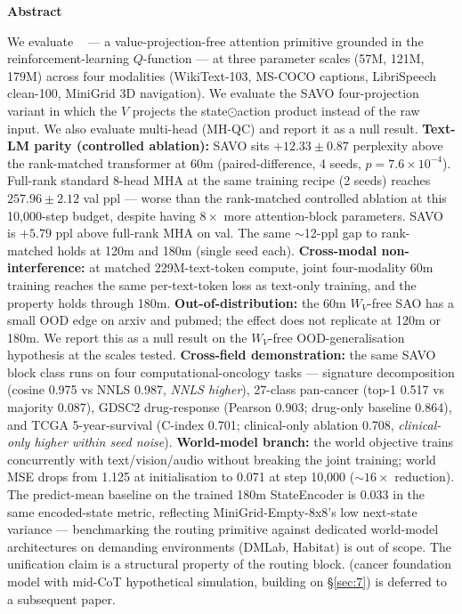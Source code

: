 \begin{center}
\textbf{Abstract}
\end{center}

{\small\noindent{}
We evaluate \QC{}~\cite{ref1} --- a value-projection-free attention primitive grounded in the reinforcement-learning $Q$-function --- at three parameter scales (57M, 121M, 179M) across four modalities (WikiText-103, MS-COCO captions, LibriSpeech clean-100, MiniGrid 3D navigation). We evaluate the SAVO four-projection variant in which the $V$ projects the state$\odot$action product instead of the raw input. We also evaluate multi-head \QC{} (MH-QC) and report it as a null result. \textbf{Text-LM parity (controlled ablation):} SAVO sits $+12.33 \pm 0.87$ perplexity above the rank-matched transformer at 60m (paired-difference, 4 seeds, $p = 7.6 \times 10^{-4}$). Full-rank standard 8-head MHA at the same training recipe (2 seeds) reaches $257.96 \pm 2.12$ val ppl --- worse than the rank-matched controlled ablation at this 10,000-step budget, despite having $8\times$ more attention-block parameters. SAVO is $+5.79$ ppl above full-rank MHA on val. The same ${\sim}$12-ppl gap to rank-matched holds at 120m and 180m (single seed each). \textbf{Cross-modal non-interference:} at matched 229M-text-token compute, joint four-modality 60m training reaches the same per-text-token loss as text-only training, and the property holds through 180m. \textbf{Out-of-distribution:} the 60m $W_V$-free SAO has a small OOD edge on arxiv and pubmed; the effect does not replicate at 120m or 180m. We report this as a null result on the $W_V$-free OOD-generalisation hypothesis at the scales tested. \textbf{Cross-field demonstration:} the same SAVO block class runs on four computational-oncology tasks --- signature decomposition (cosine 0.975 vs NNLS 0.987, \textit{NNLS higher}), 27-class pan-cancer (top-1 0.517 vs majority 0.087), GDSC2 drug-response (Pearson 0.903; drug-only baseline 0.864), and TCGA 5-year-survival (C-index 0.701; clinical-only ablation 0.708, \textit{clinical-only higher within seed noise}). \textbf{World-model branch:} the world objective trains concurrently with text/vision/audio without breaking the joint training; world MSE drops from 1.125 at initialisation to 0.071 at step 10,000 (${\sim}16\times$ reduction). The predict-mean baseline on the trained 180m StateEncoder is 0.033 in the same encoded-state metric, reflecting MiniGrid-Empty-8x8's low next-state variance --- benchmarking the routing primitive against dedicated world-model architectures on demanding environments (DMLab, Habitat) is out of scope. The unification claim is a structural property of the routing block. \NanoG{} (cancer foundation model with mid-CoT hypothetical simulation, building on \S\ref{sec:7}) is deferred to a subsequent paper.\par}
